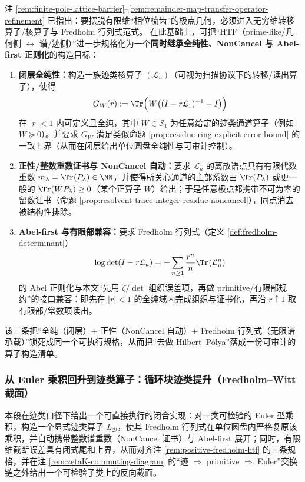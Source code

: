 \begin{remark}\label{rem:positive-fredholm-htf}
注 \ref{rem:finite-pole-lattice-barrier}--\ref{rem:remainder-map-transfer-operator-refinement} 已指出：要摆脱有限维“相位梳齿”的极点几何，必须进入无穷维转移算子/核算子与 Fredholm 行列式范式。
在此基础上，可把“HTF（prime-like/几何侧 \(\leftrightarrow\) 谱/迹侧）”进一步规格化为一个\textbf{同时继承全纯性、NonCancel 与 Abel-first 正则化}的构造目标：
\begin{enumerate}
  \item \textbf{闭层全纯性：}构造一族迹类核算子 \((\mathcal{L}_u)\)（可视为扫描协议下的转移/读出算子），使得
  \[
  G_W(r):=\Tr\Bigl(W\bigl((I-r\mathcal{L}_1)^{-1}-I\bigr)\Bigr)
  \]
  在 \(|r|<1\) 内可定义且全纯，其中 \(W\in\mathcal{S}_1\) 为任意给定的迹类通道算子（例如 \(W\succeq 0\)）。并要求 \(G_W\) 满足类似命题 \ref{prop:residue-ring-explicit-error-bound} 的一致上界（从而在闭层给出单位圆盘全纯性与可审计控制）。
  \item \textbf{正性/整数重数证书与 NonCancel 自动：}要求 \(\mathcal{L}_u\) 的离散谱点具有有限代数重数 \(m_\lambda=\Tr(P_\lambda)\in\NN\)，并使得所关心通道的主部系数由 \(\Tr(P_\lambda)\) 或更一般的 \(\Tr(WP_\lambda)\ge 0\)（某个正算子 \(W\)）给出；于是任意极点都携带不可为零的留数证书（命题 \ref{prop:resolvent-trace-integer-residue-noncancel}），同点消去被结构性排除。
  \item \textbf{Abel-first 与有限部兼容：}要求 Fredholm 行列式（定义 \ref{def:fredholm-determinant}）
  \[
  \log\det(I-r\mathcal{L}_u)=-\sum_{n\ge 1}\frac{r^n}{n}\Tr(\mathcal{L}_u^n)
  \]
  的 Abel 正则化与本文“先用 \(\zeta/\det\) 组织误差项，再做 primitive/有限部规约”的接口兼容：即先在 \(|r|<1\) 的全纯域内完成组织与证书化，再沿 \(r\uparrow 1\) 取有限部/常数项读出。
\end{enumerate}
该三条把“全纯（闭层）+ 正性（NonCancel 自动）+ Fredholm 行列式（无限谱承载）”锁死成同一个可执行规格，从而把“去做 Hilbert--P{\'o}lya”落成一份可审计的算子构造清单。
\end{remark}

\subsubsection{从 Euler 乘积回升到迹类算子：循环块迹类提升（Fredholm--Witt 截面）}\label{subsec:cyclic-traceclass-lift}

本段在迹类口径下给出一个可直接执行的闭合实现：对一类可检验的 Euler 型乘积，构造一个显式迹类算子 \(L_{\mathcal D}\)，使其 Fredholm 行列式在单位圆盘内严格复原该乘积，并自动携带整数谱重数（NonCancel 证书）与 Abel-first 展开；同时，有限维截断误差具有闭式尾和上界，从而对齐注 \ref{rem:positive-fredholm-htf} 的三条规格，并在注 \ref{rem:zetaK-commuting-diagram} 的“迹 \(\Rightarrow\) primitive \(\Rightarrow\) Euler”交换链之外给出一个可检验子类上的反向截面。

